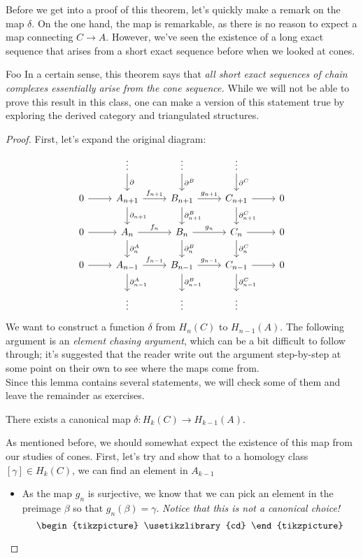 Before we get into a proof of this theorem, let's quickly make a remark on the map $\delta$. On the one hand, the map is remarkable, as there is no reason to expect a map connecting $C\to A$. However, we've seen the existence of a long exact sequence that arises from a short exact sequence before when we looked at cones. \\
\begin{projectdescription}{Foo}
In a certain sense, this theorem says that \emph{all short exact sequences of chain complexes essentially arise from the cone sequence.} While we will not be able to prove this result in this class, one can make a version of this statement true by exploring the derived category and triangulated structures.  \label{proj:derived}
\end{projectdescription}
\begin{proof}
First, let's expand the original diagram:
\[\begin{tikzcd}
\; & \vdots   \arrow{d}{\partial} & \vdots\arrow{d}{\partial^B} &\vdots \arrow{d}{\partial^C}&\\
0\arrow{r}& A_{n+1}\arrow{d}{\partial_{n+1}}\arrow{r}{f_{n+1}} & B_{n+1}\arrow{d}{\partial^B_{n+1}}\arrow{r}{g_{n+1}} & C_{n+1}\arrow{d}{\partial^C_{n+1}}\arrow{r}&0\\
0\arrow{r}& A_{n  }\arrow{d}{\partial^A_{n  }}\arrow{r}{f_{n  }} & B_{n  }\arrow{d}{\partial^B_{n  }}\arrow{r}{g_{n  }} & C_{n  }\arrow{d}{\partial^C_{n  }}\arrow{r}&0\\
0\arrow{r}& A_{n-1}\arrow{d}{\partial^A_{n-1}}\arrow{r}{f_{n-1}} & B_{n-1}\arrow{d}{\partial^B_{n-1}}\arrow{r}{g_{n-1}} & C_{n-1}\arrow{d}{\partial^C_{n-1}}\arrow{r}&0\\
\;&\vdots&\vdots&\vdots&
\end{tikzcd}\]
We want to construct a function $\delta$ from $H_{n}(C)$ to $H_{n-1}(A)$. The following argument is an \emph{element chasing argument}, which can be a bit difficult to follow through; it's suggested that the reader write out the argument step-by-step at some point on their own to see where the maps come from.\\
Since this lemma contains several statements, we will check some of them and leave the remainder as exercises. 
\begin{claim}
There exists a canonical map $\delta: H_k(C)\to H_{k-1}(A).$
\end{claim}
As mentioned before, we should somewhat expect the existence of this map from our studies of cones. First, let's try and show that to a homology class $[\gamma]\in H_k(C)$, we can find an element in $A_{k-1}$  
\begin{itemize}
\item As the map $g_n$ is surjective, we know that we can pick an element in the preimage $\beta$ so that $g_n(\beta)=\gamma$. \emph{Notice that this is not a canonical choice!}
\[ \begin{tikzpicture}
\usetikzlibrary{cd}



\end{tikzpicture}\]
\end{itemize}
\end{proof}

